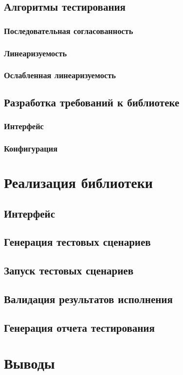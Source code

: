 \documentclass[14pt, openany]{book}
\begin{document}
\section{Алгоритмы тестирования}

\subsection{Последовательная согласованность}

\subsection{Линеаризуемость}

\subsection{Ослабленная линеаризуемость}

\section{Разработка требований к библиотеке}

\subsection{Интерфейс}

\subsection{Конфигурация}

\chapter{Реализация библиотеки}

\section{Интерфейс}

\section{Генерация тестовых сценариев}

\section{Запуск тестовых сценариев}

\section{Валидация результатов исполнения}

\section{Генерация отчета тестирования}

\chapter{Выводы}



\end{document}
